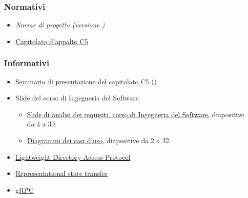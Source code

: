 \documentclass[../analisi-dei-requisiti.tex]{subfiles}
\begin{document}
\subsubsection{Normativi}%
\label{par:normativi}
\begin{itemize}
  \item \textit{Norme di progetto (versione \versione)}
  \item \href{https://www.math.unipd.it/~tullio/IS-1/2019/Progetto/C5.pdf}{Capitolato d'appalto C5}
\end{itemize}

\subsubsection{Informativi}%
\label{par:informativi}
\begin{itemize}
  \item \href{https://www.math.unipd.it/~tullio/IS-1/2019/Dispense/C5a.pdf}{Seminario di presentazione del capitolato C5} ()
  \item Slide del corso di Ingegneria del Software
        \begin{itemize}
          \item \href{https://www.math.unipd.it/~tullio/IS-1/2019/Dispense/L08.pdf}{Slide di analisi dei requisiti, corso di Ingegneria del Software}, diapositive da 4 a 30.
          \item \href{https://www.math.unipd.it/~tullio/IS-1/2019/Dispense/E03.pdf}{Diagrammi dei casi d'uso}, diapositive da 2 a 32.
        \end{itemize}
  \item \href{https://www.openldap.org/}{Lightweight Directory Access Protocol}
  \item \href{https://www.ics.uci.edu/~fielding/pubs/dissertation/rest_arch_style.htm}{Representational state transfer}
  \item \href{https://grpc.io/docs/guides/}{gRPC}
\end{itemize}
\end{document}
